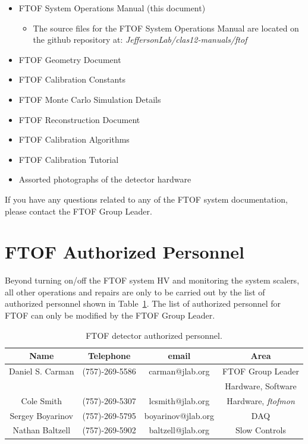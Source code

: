 \documentclass[12pt]{article}
\begin{document}
\begin{itemize}
\item FTOF System Operations Manual (this document)
 \begin{itemize}
   \item The source files for the FTOF System Operations Manual are located on the
         github repository at: {\it JeffersonLab/clas12-manuals/ftof}
 \end{itemize}
\item FTOF Geometry Document
\item FTOF Calibration Constants
\item FTOF Monte Carlo Simulation Details
\item FTOF Reconstruction Document
\item FTOF Calibration Algorithms
\item FTOF Calibration Tutorial
\item Assorted photographs of the detector hardware
\end{itemize}

If you have any questions related to any of the FTOF system documentation, please 
contact the FTOF Group Leader.

\section{FTOF Authorized Personnel}
\label{personnel}

Beyond turning on/off the FTOF system HV and monitoring the system scalers, all other 
operations and repairs are only to be carried out by the list of authorized personnel 
shown in Table~\ref{expert-list}. The list of authorized personnel for FTOF can only 
be modified by the FTOF Group Leader.

\begin{table}[htbp]
\begin{center}
\begin{tabular} {|c|c|c|c|} \hline
Name             & Telephone      & email              & Area             \\ \hline \hline
Daniel S. Carman & (757)-269-5586 & carman@jlab.org    & FTOF Group Leader\\
                 &                &                    & Hardware, Software \\ \hline
Cole Smith       & (757)-269-5307 & lcsmith@jlab.org   & Hardware, {\it ftofmon} \\ \hline
Sergey Boyarinov & (757)-269-5795 & boyarinov@jlab.org & DAQ              \\ \hline
Nathan Baltzell  & (757)-269-5902 & baltzell@jlab.org  & Slow Controls    \\ \hline
\end{tabular}
\caption{FTOF detector authorized personnel.}
\label{expert-list}
\end{center}
\end{table}
\end{document}
